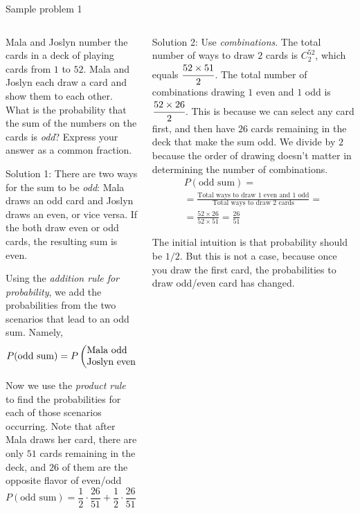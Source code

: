\documentclass[9pt,aspectratio=169]{beamer}
\begin{document}
\begin{frame}{Sample problem 1}
  \begin{columns}[T]
    \begin{column}{0.5\textwidth}
      {\small
      \begin{problem}
        Mala and Joslyn number the cards in a deck of playing cards from $1$ to $52$. Mala and Joslyn each draw a card and show them to each other. What is the probability that the sum of the numbers on the cards is \emph{odd}? Express your answer as a common fraction.
      \end{problem}

      {\color{textBlue} Solution 1:} There are two ways for the sum to be \emph{odd}:  Mala draws an odd card and Joslyn draws an even, or vice versa.  If the both draw even or odd cards, the resulting sum is even.

      Using the \emph{addition rule for probability}, we add the probabilities from the two scenarios that lead to an odd sum.  Namely, 
      \[ P(\text{odd sum}) = P\left(\text{\parbox{5.3em}{Mala odd\\Joslyn even}}\right) + P\left(\text{\parbox{4.8em}{Mala even\\Joslyn odd}}\right). \]
      
      Now we use the \emph{product rule} to find the probabilities for each of those scenarios occurring.  Note that after Mala draws her card, there are only $51$ cards remaining in the deck, and $26$ of them are the opposite flavor of even/odd
      \[ P(\text{odd sum}) = \frac{1}{2} \cdot \frac{26}{51} + \frac{1}{2} \cdot \frac{26}{51} = \frac{26}{51}. \]
      }
    \end{column}
    \begin{column}{0.5\textwidth}
      {\small
      {\color{textBlue} Solution 2:} Use \emph{combinations}. The total number of ways to draw $2$ cards is $C_2^{52}$, which equals $\cfrac{52 \times 51}{2}$. The total number of combinations drawing $1$ even and $1$ odd is $\cfrac{52 \times 26}{2}$.  This is because we can select any card first, and then have $26$ cards remaining in the deck that make the sum odd.  We divide by $2$ because the order of drawing doesn’t matter in determining the number of combinations.\begin{multline*} 
        P(\text{odd sum}) = \\ = \frac{\text{Total ways to draw $1$ even and $1$ odd}}{\text{Total ways to draw $2$ cards}} = \\ = \frac{52 \times 26}{52 \times 51} = \frac{26}{51}
      \end{multline*}
      }
      \begin{example}
        The initial intuition is that probability should be $1/2$. But this is not a case, because once you draw the first card, the probabilities to draw odd/even card has changed.  
      \end{example}
    \end{column}
  \end{columns}
\end{frame}
\end{document}
